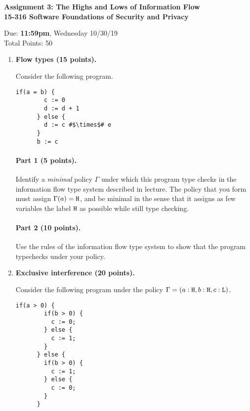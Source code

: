 \documentclass[10pt]{article}
\begin{document}
\begin{center}
\textbf{ Assignment 3: The Highs and Lows of Information Flow\\15-316 Software Foundations of Security and Privacy}\\
\end{center}
Due: \textbf{ 11:59pm}, Wednesday 10/30/19 \\
Total Points: 50

\vspace{-5mm}

\begin{enumerate}
\item \textbf{Flow types (15 points).} 

Consider the following program.
\begin{lstlisting}[escapechar=\#]
      if(a = b) {
        c := 0
        d := d + 1
      } else {
        d := c #$\times$# e
      }
      b := c
\end{lstlisting}
\paragraph{Part 1 (5 points).}
Identify a \emph{minimal} policy $\Gamma$ under which this program type checks in the information flow type system described in lecture.
The policy that you form must assign $\Gamma(a) = \texttt{\upshape H}$, and be minimal in the sense that it assigns as few variables the label $\texttt{\upshape H}$ as possible while still type checking.


\newpage

\paragraph{Part 2 (10 points).}
Use the rules of the information flow type system to show that the program typechecks under your policy.


\newpage

\item \textbf{Exclusive interference (20 points).}

Consider the following program under the policy $\Gamma = (a : \texttt{\upshape H}, b : \texttt{\upshape H}, c : \texttt{\upshape L})$.

\begin{lstlisting}[escapechar=\#]
      if(a > 0) {
        if(b > 0) {
          c := 0;
        } else {
          c := 1;
        }
      } else {
        if(b > 0) {
          c := 1;
        } else {
          c := 0;
        }
      }
\end{lstlisting}


\end{enumerate}
\end{document}
